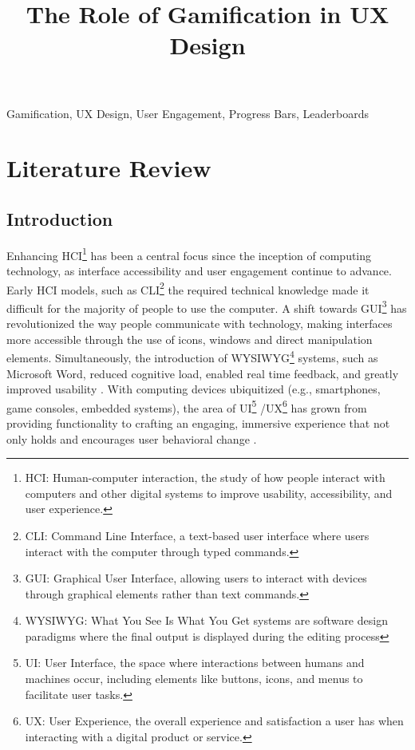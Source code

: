 \documentclass[conference]{IEEEtran}
\begin{document}
\title{The Role of Gamification in UX Design}



\maketitle


\begin{IEEEkeywords}
Gamification, UX Design, User Engagement, Progress Bars, Leaderboards
\end{IEEEkeywords}

\section{Literature Review}

\subsection{Introduction}

Enhancing HCI\footnote{HCI: Human-computer interaction, the study of how people interact with computers and other digital systems to improve usability, accessibility, and user experience.} has been a central focus since the inception of computing technology, as interface accessibility and user engagement continue to advance. Early HCI models, such as CLI\footnote{CLI: Command Line Interface, a text-based user interface where users interact with the computer through typed commands.} the required technical knowledge made it difficult for the majority of people to use the computer. A shift towards GUI\footnote{GUI: Graphical User Interface, allowing users to interact with devices through graphical elements rather than text commands.} \cite{curtis1989, fishkin2000} has revolutionized the way people communicate with technology, making interfaces more accessible through the use of icons, windows and direct manipulation elements. Simultaneously, the introduction of WYSIWYG\footnote{WYSIWYG: What You See Is What You Get systems are software design paradigms where the final output is displayed during the editing process} systems, such as Microsoft Word, reduced cognitive load, enabled real time feedback, and greatly improved usability \cite{marchionini1992}. With computing devices ubiquitized (e.g., smartphones, game consoles, embedded systems), the area of UI\footnote{UI: User Interface, the space where interactions between humans and machines occur, including elements like buttons, icons, and menus to facilitate user tasks.}
/UX\footnote{UX: User Experience, the overall experience and satisfaction a user has when interacting with a digital product or service.} has grown from providing functionality to crafting an engaging, immersive experience that not only holds and encourages user behavioral change \cite{deliu2017}.
\end{document}
